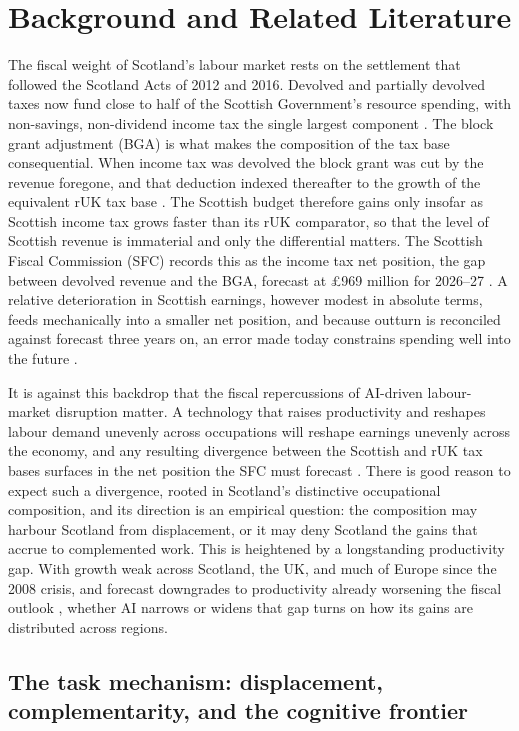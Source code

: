 \section{Background and Related Literature}\label{sec:background}

The fiscal weight of Scotland's labour market rests on the settlement that followed the Scotland Acts of 2012 and 2016. Devolved and partially devolved taxes now fund close to half of the Scottish Government's resource spending, with non-savings, non-dividend income tax the single largest component \citep{sfc2026}. The block grant adjustment (BGA) is what makes the composition of the tax base consequential. When income tax was devolved the block grant was cut by the revenue foregone, and that deduction indexed thereafter to the growth of the equivalent rUK tax base \citep{gov2023}. The Scottish budget therefore gains only insofar as Scottish income tax grows faster than its rUK comparator, so that the level of Scottish revenue is immaterial and only the differential matters. The Scottish Fiscal Commission (SFC) records this as the income tax net position, the gap between devolved revenue and the BGA, forecast at £969 million for 2026--27 \citep{sfc2026}. A relative deterioration in Scottish earnings, however modest in absolute terms, feeds mechanically into a smaller net position, and because outturn is reconciled against forecast three years on, an error made today constrains spending well into the future \citep{gov2023}.

It is against this backdrop that the fiscal repercussions of AI-driven labour-market disruption matter. A technology that raises productivity and reshapes labour demand unevenly across occupations will reshape earnings unevenly across the economy, and any resulting divergence between the Scottish and rUK tax bases surfaces in the net position the SFC must forecast \citep{sfc2016}. There is good reason to expect such a divergence, rooted in Scotland's distinctive occupational composition, and its direction is an empirical question: the composition may harbour Scotland from displacement, or it may deny Scotland the gains that accrue to complemented work. This is heightened by a longstanding productivity gap. With growth weak across Scotland, the UK, and much of Europe since the 2008 crisis, and forecast downgrades to productivity already worsening the fiscal outlook \citep{sfc2026}, whether AI narrows or widens that gap turns on how its gains are distributed across regions.

\subsection*{The task mechanism: displacement, complementarity, and the cognitive frontier}

